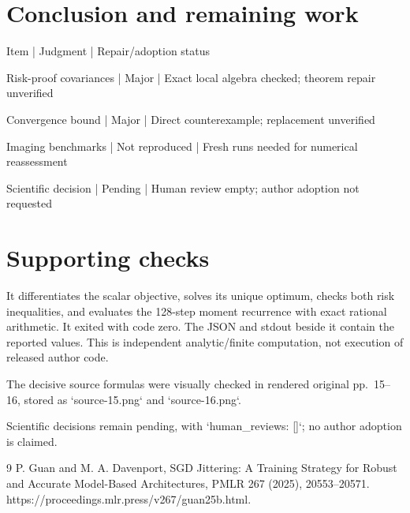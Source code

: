 \documentclass[10pt]{article}
\begin{document}
\section*{Conclusion and remaining work}
Item | Judgment | Repair/adoption status\par
Risk-proof covariances | Major | Exact local algebra checked; theorem repair unverified\par
Convergence bound | Major | Direct counterexample; replacement unverified\par
Imaging benchmarks | Not reproduced | Fresh runs needed for numerical reassessment\par
Scientific decision | Pending | Human review empty; author adoption not requested\par
\section*{Supporting checks}
It differentiates the scalar objective, solves its unique optimum, checks both risk inequalities, and evaluates the 128-step moment recurrence with exact rational arithmetic. It exited with code zero. The JSON and stdout beside it contain the reported values. This is independent analytic/finite computation, not execution of released author code.\par
The decisive source formulas were visually checked in rendered original pp. 15–16, stored as `source-15.png` and `source-16.png`.\par
Scientific decisions remain pending, with `human\_reviews: []`; no author adoption is claimed.\par
9 P. Guan and M. A. Davenport, SGD Jittering: A Training Strategy for Robust and Accurate Model-Based Architectures, PMLR 267 (2025), 20553–20571. https://proceedings.mlr.press/v267/guan25b.html.\par
\end{document}
